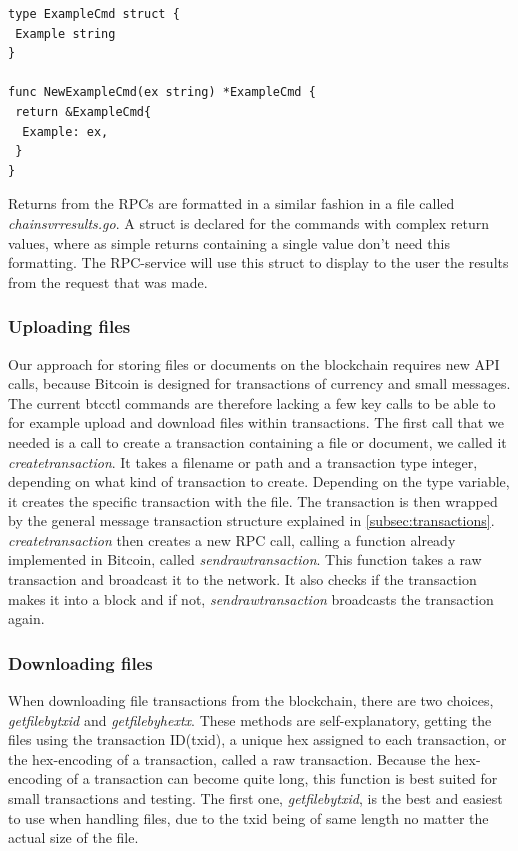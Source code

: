\documentclass[12pt]{article}
\begin{document}
\begin{lstlisting}[float=h!,caption={Command argument formatting},label=lst:cmdArg]
type ExampleCmd struct {
 Example string
}

func NewExampleCmd(ex string) *ExampleCmd {
 return &ExampleCmd{
  Example: ex,
 }
}
\end{lstlisting}

Returns from the RPCs are formatted in a similar fashion in a file called \textit{chainsvrresults.go}. A struct is declared for the commands with complex return values, where as simple returns containing a single value don't need this formatting. The RPC-service will use this struct to display to the user the results from the request that was made. 
 
\subsubsection{Uploading files}
Our approach for storing files or documents on the blockchain requires new API calls, because Bitcoin is designed for transactions of currency and small messages. The current btcctl commands are therefore lacking a few key calls to be able to for example upload and download files within transactions. The first call that we needed is a call to create a transaction containing a file or document, we called it \textit{createtransaction}.  It takes a filename or path and a transaction type integer, depending on what kind of transaction to create. Depending on the type variable, it creates the specific transaction with the file. The transaction is then wrapped by the general message transaction structure explained in \ref{subsec:transactions}. \textit{createtransaction} then creates a new RPC call, calling a function already implemented in Bitcoin, called \textit{sendrawtransaction}. This function takes a raw transaction and broadcast it to the network. It also checks if the transaction makes it into a block and if not, \textit{sendrawtransaction} broadcasts the transaction again. 

\subsubsection{Downloading files}
When downloading file transactions from the blockchain, there are two choices, \textit{getfilebytxid} and \textit{getfilebyhextx}. These methods are self-explanatory, getting the files using the transaction ID(txid), a unique hex assigned to each transaction, or the hex-encoding of a transaction, called a raw transaction.  Because the hex-encoding of a transaction can become quite long, this function is best suited for small transactions and testing. The first one, \textit{getfilebytxid}, is the best and easiest to use when handling files, due to the txid being of same length no matter the actual size of the file. 
\end{document}
